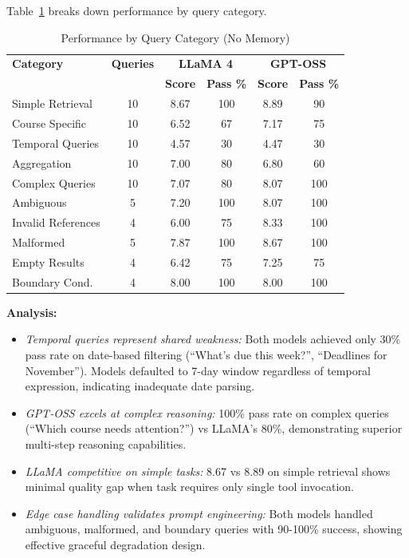 \documentclass{article}
\begin{document}
Table~\ref{tab:category_performance} breaks down performance by query category.

\begin{table}[h]
\centering
\caption{Performance by Query Category (No Memory)}
\label{tab:category_performance}
\begin{tabular}{lccccc}
\toprule
\textbf{Category} & \textbf{Queries} & \multicolumn{2}{c}{\textbf{LLaMA 4}} & \multicolumn{2}{c}{\textbf{GPT-OSS}} \\
 & & \textbf{Score} & \textbf{Pass \%} & \textbf{Score} & \textbf{Pass \%} \\
\midrule
Simple Retrieval & 10 & 8.67 & 100 & 8.89 & 90 \\
Course Specific & 10 & 6.52 & 67 & 7.17 & 75 \\
Temporal Queries & 10 & 4.57 & 30 & 4.47 & 30 \\
Aggregation & 10 & 7.00 & 80 & 6.80 & 60 \\
Complex Queries & 10 & 7.07 & 80 & 8.07 & 100 \\
\midrule
Ambiguous & 5 & 7.20 & 100 & 8.07 & 100 \\
Invalid References & 4 & 6.00 & 75 & 8.33 & 100 \\
Malformed & 5 & 7.87 & 100 & 8.67 & 100 \\
Empty Results & 4 & 6.42 & 75 & 7.25 & 75 \\
Boundary Cond. & 4 & 8.00 & 100 & 8.00 & 100 \\
\bottomrule
\end{tabular}
\end{table}

\textbf{Analysis:}
\begin{itemize}
    \item \textit{Temporal queries represent shared weakness:} Both models achieved only 30\% pass rate on date-based filtering (``What's due this week?'', ``Deadlines for November''). Models defaulted to 7-day window regardless of temporal expression, indicating inadequate date parsing.
    
    \item \textit{GPT-OSS excels at complex reasoning:} 100\% pass rate on complex queries (``Which course needs attention?'') vs LLaMA's 80\%, demonstrating superior multi-step reasoning capabilities.
    
    \item \textit{LLaMA competitive on simple tasks:} 8.67 vs 8.89 on simple retrieval shows minimal quality gap when task requires only single tool invocation.
    
    \item \textit{Edge case handling validates prompt engineering:} Both models handled ambiguous, malformed, and boundary queries with 90-100\% success, showing effective graceful degradation design.
\end{itemize}
\end{document}

